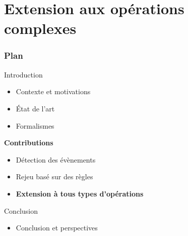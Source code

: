 \documentclass[aspectratio=1610]{beamer}
\begin{document}
\section[Extension]{Extension aux opérations complexes}
\begin{frame}
	\frametitle{Plan}
	\centering
	\begin{minipage}{\textwidth}
    \raggedright
  \begin{minipage}{.55\textwidth}
		\begin{mytocblock}{Introduction}
			\begin{itemize}
				\item[] Contexte et motivations
				\item[] État de l'art
				\item[] Formalismes
			\end{itemize}
		\end{mytocblock}
  \end{minipage}

  \vspace{1em}

  \begin{minipage}{.55\textwidth}
    \begin{mytocblock}{\textbf{Contributions}}
			\begin{itemize}
				\item[] Détection des évènements
				\item[] Rejeu basé sur des règles
				\item[] \textbf{Extension à tous types d'opérations}
			\end{itemize}
		\end{mytocblock}
  \end{minipage}

  \vspace{1em}

  \begin{minipage}{.55\textwidth}
    \begin{mytocblock}{Conclusion}
			\begin{itemize}
				\item[] Conclusion et perspectives
			\end{itemize}
		\end{mytocblock}
  \end{minipage}
\end{minipage}
\end{frame}

\end{document}
